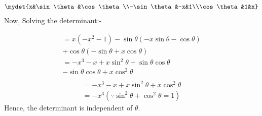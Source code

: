 
 \begin{align}
  \mydet{x&\sin\theta&\cos\theta\\-\sin\theta&-x&1\\\cos\theta&1&x}
  \end{align}
  Now, Solving the determinant:-
  

  \begin{multline}
  =x(-x^{2}-1)-\sin\theta(-x\sin\theta-\cos\theta)\\
  +\cos\theta(-\sin\theta+x\cos\theta)
  \\
  =-x^{3}-x+x\sin^{2}\theta+\sin\theta\cos\theta \\ 
  -\sin\theta\cos\theta+x\cos^{2}\theta\\
  \end{multline}
 \begin{align}
  =-x^{3}-x+x\sin^{2}\theta+x\cos^{2}\theta\\
  =-x^{3}(\because \sin^{2}\theta+\cos^{2}\theta=1)
  \end{align}
  Hence, the determinant is independent of $\theta$.
